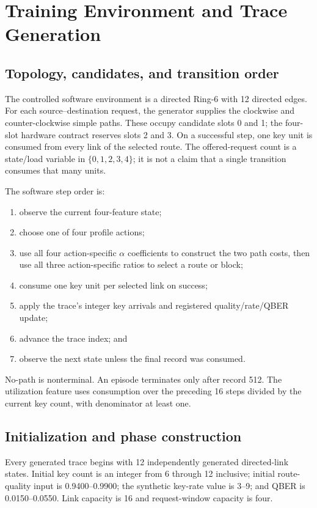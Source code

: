 \section{Training Environment and Trace Generation}

\subsection{Topology, candidates, and transition order}

The controlled software environment is a directed Ring-6 with 12 directed edges.
For each source--destination request, the generator supplies the clockwise and
counter-clockwise simple paths. These occupy candidate slots 0 and 1; the four-slot
hardware contract reserves slots 2 and 3. On a successful step, one key unit is
consumed from every link of the selected route. The offered-request count is a
state/load variable in $\{0,1,2,3,4\}$; it is not a claim that a single transition
consumes that many units.

The software step order is:
\begin{enumerate}
  \item observe the current four-feature state;
  \item choose one of four profile actions;
  \item use all four action-specific $\alpha$ coefficients to construct the two path
  costs, then use all three action-specific ratios to select a route or block;
  \item consume one key unit per selected link on success;
  \item apply the trace's integer key arrivals and registered quality/rate/QBER update;
  \item advance the trace index; and
  \item observe the next state unless the final record was consumed.
\end{enumerate}
No-path is nonterminal. An episode terminates only after record 512. The utilization
feature uses consumption over the preceding 16 steps divided by the current key
count, with denominator at least one.

\subsection{Initialization and phase construction}

Every generated trace begins with 12 independently generated directed-link states.
Initial key count is an integer from 6 through 12 inclusive; initial route-quality
input is 0.9400--0.9900; the synthetic key-rate value is 3--9; and QBER is
0.0150--0.0550. Link capacity is 16 and request-window capacity is four.

